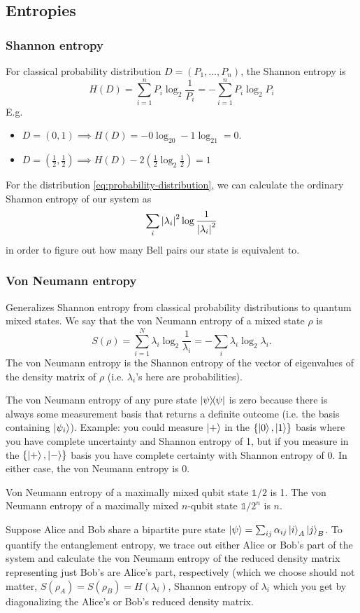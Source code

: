 \documentclass[12pt]{article}
\newcommand*\id{\mathds{1}}
\begin{document}
\subsection{Entropies}
\subsubsection{Shannon entropy}
For classical probability distribution $D = (P_1, \ldots, P_n)$, the Shannon
entropy is
\[H(D) = \sum_{i=1}^n P_i\log_2\frac{1}{P_i} = -\sum_{i=1}^n P_i\log_2 P_i\]
E.g.
\begin{itemize}
    \item  $D = (0, 1) \implies H(D) = -0\log_20 - 1\log_21 = 0$.
    \item $D = (\frac{1}{2}, \frac{1}{2}) \implies H(D)
        -2(\frac{1}{2}\log_2\frac{1}{2}) = 1$
\end{itemize}
For the distribution \eqref{eq:probability-distribution}, we can calculate the
ordinary Shannon entropy of our system as
\[\sum_i\abs{\lambda_i}^2\log\frac{1}{\abs{\lambda_i}^2}\]
in order to figure out how many Bell pairs our state is equivalent to.

\subsubsection{Von Neumann entropy}
Generalizes Shannon entropy from classical probability distributions to quantum
mixed states. We say that the von Neumann entropy of a mixed state $\rho$ is
\[S(\rho) = \sum_{i=1}^N \lambda_i \log_2 \frac{1}{\lambda_i}
= -\sum_i \lambda_i \log_2\lambda_i.\]
The von Neumann entropy is the Shannon entropy of the vector of eigenvalues of
the density matrix of $\rho$ (i.e. $\lambda_i$'s here are probabilities).

The von Neumann entropy of any pure state $\ketbra{\psi}$ is zero because there
is always some measurement basis that returns a definite outcome (i.e. the
basis containing $\ket{\psi_i}$). Example: you could measure $\ket{+}$ in the
$\{\ket{0}, \ket{1}\}$ basis where you have complete uncertainty and Shannon
entropy of 1, but if you measure in the $\{\ket{+}, \ket{-}\}$ basis you have
complete certainty with Shannon entropy of 0. In either case, the von Neumann
entropy is 0.

Von Neumann entropy of a maximally mixed qubit state $\id/2$ is 1. The von
Neumann entropy of a maximally mixed $n$-qubit state $\id/2^n$ is $n$.

Suppose Alice and Bob share a bipartite pure state $\ket{\psi} =
\sum_{ij}\alpha_{ij}\ket{i}_A\ket{j}_B$. To quantify the entanglement entropy,
we trace out either Alice or Bob's part of the system and calculate the von
Neumann entropy of the reduced density matrix representing just Bob's are
Alice's part, respectively (which we choose should not matter, $S(\rho_A) =
S(\rho_B) = H(\lambda_i)$, Shannon entropy of $\lambda_i$ which you get by
diagonalizing the Alice's or Bob's reduced density matrix.
\end{document}
